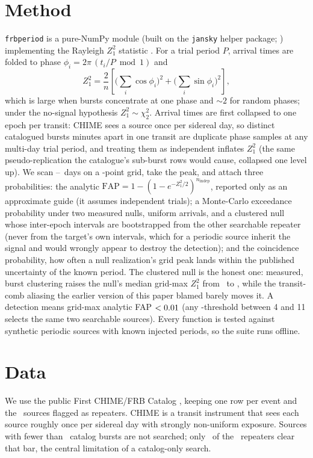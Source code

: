 \documentclass[twocolumn]{aastex631}
\newcommand{\code}[1]{\texttt{#1}}
\begin{document}
\section{Method}
\code{frbperiod} is a pure-NumPy module (built on the \code{jansky} helper package; \citealt{jansky})
implementing the Rayleigh $Z^2_1$ statistic \citep{buccheri1983}. For a trial period $P$, arrival
times are folded to phase $\phi_i = 2\pi\,(t_i/P \bmod 1)$ and
\begin{equation}
Z^2_1 = \frac{2}{n}\left[\Big(\textstyle\sum_i\cos\phi_i\Big)^2 + \Big(\sum_i\sin\phi_i\Big)^2\right],
\end{equation}
which is large when bursts concentrate at one phase and $\sim2$ for random phases; under the
no-signal hypothesis $Z^2_1\sim\chi^2_2$. Arrival times are first collapsed to one epoch per
transit: CHIME sees a source once per sidereal day, so distinct catalogued bursts minutes apart
in one transit are duplicate phase samples at any multi-day trial period, and treating them as
independent inflates $Z^2_1$ (the same pseudo-replication the catalogue's sub-burst rows would
cause, collapsed one level up). We scan \fpPmin--\fpPmax~days on a \fpNgrid-point grid, take
the peak, and attach three probabilities: the analytic
$\mathrm{FAP}=1-(1-e^{-Z^2_1/2})^{n_\mathrm{indep}}$, reported only as an approximate guide (it
assumes independent trials); a Monte-Carlo exceedance probability under two measured nulls,
uniform arrivals, and a clustered null whose inter-epoch intervals are bootstrapped from the
other searchable repeater (never from the target's own intervals, which for a periodic
source inherit the signal and would wrongly appear to destroy the detection); and the
coincidence probability, how often a null realization's grid peak lands within the published
uncertainty of the known period. The clustered null is the honest one: measured, burst
clustering raises the null's median grid-max $Z^2_1$ from \fpUniMedZ\ to \fpCluMedZ, while
the transit-comb aliasing the earlier version of this paper blamed barely moves it. A
detection means grid-max analytic FAP $<0.01$ (any \fpMinBursts-threshold between
4 and 11 selects the same two searchable sources). Every function is tested against synthetic
periodic sources with known injected periods, so the suite runs offline.

\section{Data}
We use the public First CHIME/FRB Catalog \citep{chimecat1}, keeping one row per event and the
\fpNsources\ sources flagged as repeaters. CHIME is a transit instrument that sees each source
roughly once per sidereal day with strongly non-uniform exposure. Sources with fewer than
\fpMinBursts\ catalog bursts are not searched; only \fpNsearch\ of the \fpNsources\ repeaters clear
that bar, the central limitation of a catalog-only search.
\end{document}
